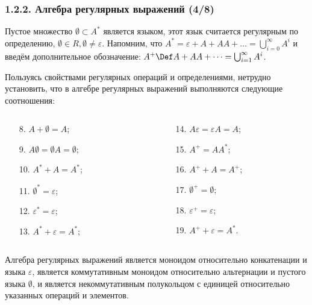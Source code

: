 \begin{frame}
\frametitle{1.2.2. Алгебра регулярных выражений (4/8)}
Пустое множество $\emptyset\subset A^*$ 
является языком, этот язык считается регулярным по определению, $\emptyset\in R, \emptyset\ne\varepsilon$. 
Напомним, что $A^*= \varepsilon +A + AA+ \dots =
\bigcup_{i=0}^\infty A^i$ и введём дополнительное обозначение:
$A^+ \Def A + AA+ \dots = \bigcup_{i=1}^\infty A^i$.
  
Пользуясь свойствами регулярных операций и определениями, 
нетрудно установить, что в алгебре 
регулярных выражений
выполняются следующие соотношения:

\vspace{-16pt}
\begin{columns}[t]
\begin{column}{7cm}
\begin{enumerate}
\item[8.] $A+\emptyset = A$;
\item[9.] $A\emptyset = \emptyset A=\emptyset$;
\item[10.] $A^* +A =A^*$;
\item[11.] $\emptyset^*=\varepsilon$;
\item[12.] $\varepsilon^*=\varepsilon$;
\item[13.] $A^* + \varepsilon=A^*$;
\end{enumerate}
\end{column}
\begin{column}{7cm}
\begin{enumerate}
\item[14.] $A\varepsilon = \varepsilon A = A$;
\item[15.] $A^+=AA^*$;
\item[16.] $A^+ + A =A^+$;
\item[17.] $\emptyset^+ = \emptyset$;
\item[18.] $\varepsilon^+=\varepsilon$;
\item[19.] $A^+ + \varepsilon=A^*$.
\end{enumerate}
\end{column}
\end{columns} 

\vspace{2pt}
\begin{remark}
Алгебра регулярных выражений является моноидом относительно конкатенации и языка $\varepsilon$,
является коммутативным моноидом
относительно альтернации и пустого языка
$\emptyset$, и является некоммутативным
полукольцом с единицей относительно 
указанных операций и элементов.  
\end{remark}
\end{frame}


